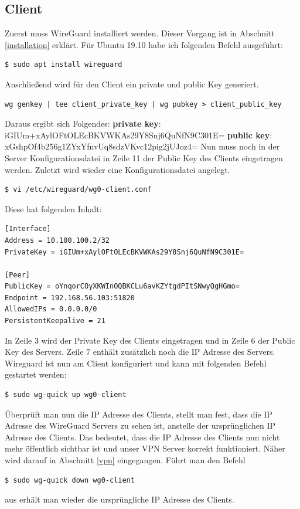 \subsection{Client}
Zuerst muss WireGuard installiert werden. Dieser Vorgang ist in Abschnitt \ref{installation} erklärt. Für Ubuntu 19.10 habe ich folgenden Befehl ausgeführt:
\begin{lstlisting}
$ sudo apt install wireguard
\end{lstlisting} 
 Anschließend wird für den Client ein private und public Key generiert.
\begin{lstlisting}
wg genkey | tee client_private_key | wg pubkey > client_public_key
\end{lstlisting}
Daraus ergibt sich Folgendes:\newline
\textbf{private key}: iGIUm+xAylOFtOLEcBKVWKAs29Y8Snj6QuNfN9C301E= \newline
\textbf{public key}: xGshpOf4b256g1ZYxYfnvUq8sdzVKvc12pig2jUJoz4= \newline
Nun muss noch in der Server Konfigurationsdatei in Zeile 11 der Public Key des Clients eingetragen werden. \newline\newline
Zuletzt wird wieder eine Konfigurationsdatei angelegt.
\begin{lstlisting}
$ vi /etc/wireguard/wg0-client.conf
\end{lstlisting}
Diese hat folgenden Inhalt:
\begin{lstlisting}
[Interface]
Address = 10.100.100.2/32
PrivateKey = iGIUm+xAylOFtOLEcBKVWKAs29Y8Snj6QuNfN9C301E=

[Peer]
PublicKey = oYnqorCOyXKWInOQBKCLu6avKZYtgdPItSNwyQgHGmo=
Endpoint = 192.168.56.103:51820
AllowedIPs = 0.0.0.0/0
PersistentKeepalive = 21
\end{lstlisting}
In Zeile 3 wird der Private Key des Clients eingetragen und in Zeile 6 der Public Key des Servers. Zeile 7 enthält zusätzlich noch die IP Adresse des Servers. \newline
Wireguard ist nun am Client konfiguriert und kann mit folgenden Befehl gestartet werden:
\begin{lstlisting}
$ sudo wg-quick up wg0-client
\end{lstlisting}
Überprüft man nun die IP Adresse des Clients, stellt man fest, dass die IP Adresse des WireGuard Servers zu sehen ist, anstelle der ursprünglichen IP Adresse des Clients. Das bedeutet, dass die IP Adresse des Clients nun nicht mehr öffentlich sichtbar ist und unser VPN Server korrekt funktioniert. Näher wird darauf in Abschnitt \ref{vpn} eingegangen. \newline \newline
Führt man den Befehl
\begin{lstlisting}
$ sudo wg-quick down wg0-client
\end{lstlisting}
aus erhält man wieder die ursprüngliche IP Adresse des Clients.
\newpage
